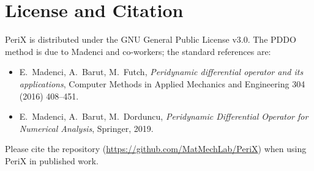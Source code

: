 \documentclass[11pt,a4paper]{article}
\newcommand{\PeriX}{\textsf{PeriX}}
\begin{document}
\section{License and Citation}

\PeriX{} is distributed under the GNU General Public License v3.0.
The PDDO method is due to Madenci and co-workers; the standard
references are:

\begin{itemize}[nosep]
  \item E.~Madenci, A.~Barut, M.~Futch,
        \emph{Peridynamic differential operator and its
        applications}, Computer Methods in Applied Mechanics and
        Engineering 304 (2016) 408--451.
  \item E.~Madenci, A.~Barut, M.~Dorduncu,
        \emph{Peridynamic Differential Operator for Numerical
        Analysis}, Springer, 2019.
\end{itemize}

Please cite the repository
(\url{https://github.com/MatMechLab/PeriX}) when using \PeriX{} in
published work.
\end{document}
